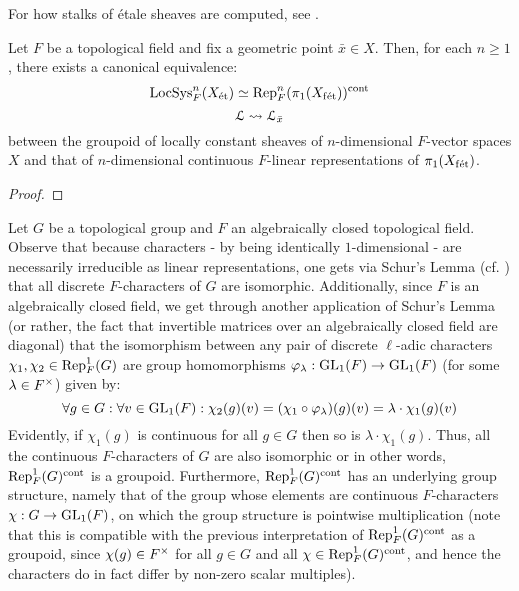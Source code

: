         \begin{remark}
            For how stalks of \'etale sheaves are computed, see \cite[\href{https://stacks.math.columbia.edu/tag/03PN}{Tag 03PN}]{stacks}.
        \end{remark}
        \begin{lemma} \label{lemma: representations_of_the_etale_fundamental_group}
            Let $F$ be a topological field and fix a geometric point $\bar{x} \in X$. Then, for each $n \geq 1$, there exists a canonical equivalence:
                $$\mathrm{LocSys}_F^n(X_{\mathrm{\acute{e}t}}) \simeq \mathrm{Rep}_F^n(\pi_1(X_{\mathrm{f\acute{e}t}}))^{\mathrm{cont}}$$
                $$\mathcal{L} \leadsto \mathcal{L}_{\bar{x}}$$
            between the groupoid of locally constant sheaves of $n$-dimensional $F$-vector spaces $X$ and that of $n$-dimensional continuous $F$-linear representations of $\pi_1(X_{\mathrm{f\acute{e}t}})$.
        \end{lemma}
            \begin{proof}
                
            \end{proof}
        \begin{remark} \label{remark: groupoids_of_characters}
            Let $G$ be a topological group and $F$ an algebraically closed topological field. Observe that because characters - by being identically $1$-dimensional - are necessarily irreducible as linear representations, one gets via Schur's Lemma (cf. \cite[Lemma 3.6, pp. 35]{lam_first_course_in_noncommutative_rings}) that all discrete $F$-characters of $G$ are isomorphic. Additionally, since $F$ is an algebraically closed field, we get through another application of Schur's Lemma (or rather, the fact that invertible matrices over an algebraically closed field are diagonal) that the isomorphism between any pair of discrete $\ell$-adic characters $\chi_1, \chi_2 \in \mathrm{Rep}^1_F(G)$ are group homomorphisms $\varphi_{\lambda}: \operatorname{GL}_1(F) \to \operatorname{GL}_1(F)$ (for some $\lambda \in F^{\x}$) given by:
                $$\forall g \in G: \forall v \in \operatorname{GL}_1(F): \chi_2(g)(v) = (\chi_1 \circ \varphi_{\lambda})(g)(v) = \lambda \cdot \chi_1(g)(v)$$
            Evidently, if $\chi_1(g)$ is continuous for all $g \in G$ then so is $\lambda \cdot \chi_1(g)$. Thus, all the continuous $F$-characters of $G$ are also isomorphic or in other words, $\mathrm{Rep}^1_F(G)^{\mathrm{cont}}$ is a groupoid. Furthermore, $\mathrm{Rep}^1_F(G)^{\mathrm{cont}}$ has an underlying group structure, namely that of the group whose elements are continuous $F$-characters $\chi: G \to \operatorname{GL}_1(F)$, on which the group structure is pointwise multiplication (note that this is compatible with the previous interpretation of $\mathrm{Rep}^1_F(G)^{\mathrm{cont}}$ as a groupoid, since $\chi(g) \in F^{\x}$ for all $g \in G$ and all $\chi \in \mathrm{Rep}^1_F(G)^{\mathrm{cont}}$, and hence the characters do in fact differ by non-zero scalar multiples).
        \end{remark}
